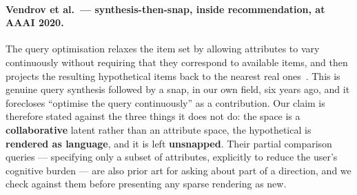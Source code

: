 \documentclass[11pt]{article}
\begin{document}
\paragraph{Vendrov et al.\ --- synthesis-then-snap, inside recommendation, at AAAI 2020.} The query
optimisation relaxes the item set by allowing attributes to vary continuously without requiring that
they correspond to available items, and then projects the resulting hypothetical items back to the
nearest real ones~\cite{vendrov2020gradient}. This is genuine query synthesis followed by a snap, in
our own field, six years ago, and it forecloses ``optimise the query continuously'' as a
contribution. Our claim is therefore stated against the three things it does not do: the space is a
\textbf{collaborative} latent rather than an attribute space, the hypothetical is \textbf{rendered as
language}, and it is left \textbf{unsnapped}. Their partial comparison queries --- specifying only a
subset of attributes, explicitly to reduce the user's cognitive burden --- are also prior art for
asking about part of a direction, and we check against them before presenting any sparse rendering as
new.
\end{document}
